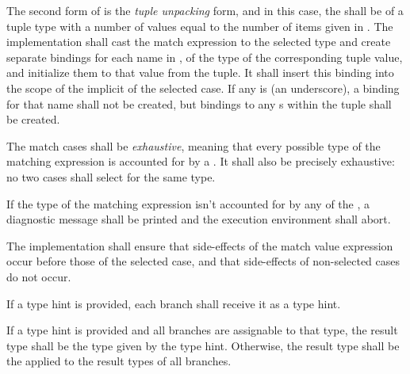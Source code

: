\specsubsubitem
The second form of  is the \textit{tuple unpacking}
form, and in this case, the  shall be of a tuple type
with a number of values equal to the number of items given in
. The implementation shall cast the match expression
to the selected type and create separate bindings for each name in
, of the type of the corresponding tuple value, and
initialize them to that value from the tuple. It shall insert this binding into
the scope of the implicit  of the selected
case. If any  is \terminal{\_} (an underscore),
a binding for that name shall not be created, but bindings
to any s within the tuple shall be created.

\specsubsubitem
The match cases shall be \textit{exhaustive}, meaning that every possible type
of the matching expression is accounted for by a . It
shall also be precisely exhaustive: no two cases shall select for the same
type.

\specsubsubitem
If the type of the matching expression isn't accounted for by any of the
, a diagnostic message shall be printed and the
execution environment shall abort.


\specsubsubitem
The implementation shall ensure that side-effects of the match value
expression occur before those of the selected case, and that side-effects of
non-selected cases do not occur.

\specsubsubitem
If a type hint is provided, each branch shall receive it as a type hint.

\specsubsubitem
If a type hint is provided and all branches are assignable to that type, the
result type shall be the type given by the type hint. Otherwise, the result type
shall be the  applied to the result
types of all branches.


